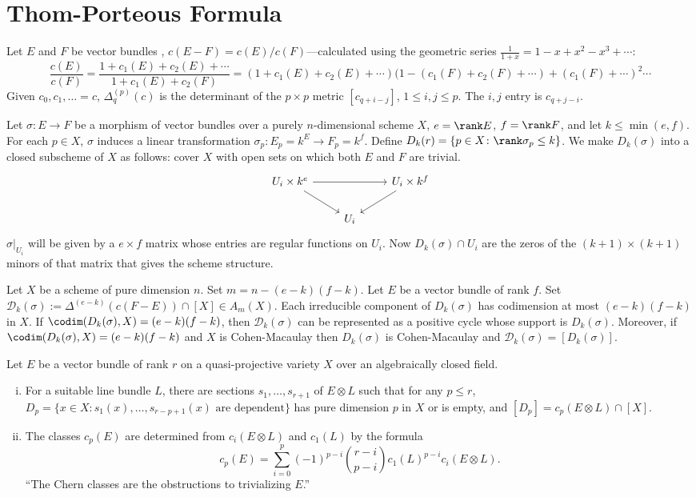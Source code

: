 \section{Thom-Porteous Formula}


Let $E$ and $F$ be vector bundles , $c(E-F)=c(E)/c(F)$---calculated using the geometric series $\frac{1}{1+x}=1-x+x^2-x^3+\cdots$:
	\[
	\dfrac{c(E)}{c(F)}= \dfrac{1+c_1(E)+c_2(E)+\cdots}{1+c_1(E)+c_2(F)} = (1+c_1(E)+c_2(E)+\cdots)(1- (c_1(F)+c_2(F)+\cdots) + (c_1(F)+\cdots)^2 \cdots
	\]
Given $c_0,c_1,\ldots=c$, $\Delta_q^{(p)}(c)$ is the determinant of the $p \times p$ metric $[c_{q+i-j}]$, $1 \leq i, j \leq p$. The $i,j$ entry is $c_{q+j-i}$.

Let $\sigma: E \to F$ be a morphism of vector bundles over a purely $n$-dimensional scheme $X$, $e=\rank E$, $f=\rank F$, and let $k \leq \min(e,f)$. For each $p \in X$, $\sigma$ induces a linear transformation $\sigma_p: E_p=k^E \to F_p=k^f$. Define $D_k(r)=\{p \in X \colon \rank \sigma_p \leq k \}$. We make $D_k(\sigma)$ into a closed subscheme of $X$ as follows: cover $X$ with open sets on which both $E$ and $F$ are trivial. 
	\[
	\begin{tikzcd}
	U_i \times k^e \arrow{rr} \arrow{dr} & & U_i \times k^f \arrow{dl} \\
	& U_i & 
	\end{tikzcd}
	\]
$\sigma\big|_{U_i}$ will be given by a $e \times f$ matrix whose entries are regular functions on $U_i$. Now $D_k(\sigma) \cap U_i$ are the zeros of the $(k+1) \times (k+1)$ minors of that matrix that gives the scheme structure. 

\begin{thmm}
Let $X$ be a scheme of pure dimension $n$. Set $m=n-(e-k)(f-k)$. Let $E$ be a vector bundle of rank $f$. Set $\mathcal{D}_k(\sigma):= \Delta^{(e-k)}(c(F-E)) \cap [X] \in A_m(X)$. Each irreducible component of $D_k(\sigma)$ has codimension at most $(e-k)(f-k)$ in $X$. If $\codim(D_k(\sigma),X)=(e-k)(f-k)$, then $\mathcal{D}_k(\sigma)$ can be represented as a positive cycle whose support is $D_k(\sigma)$. Moreover, if $\codim(D_k(\sigma),X)=(e-k)(f-k)$ and $X$ is Cohen-Macaulay then $D_k(\sigma)$ is Cohen-Macaulay and $\mathcal{D}_k(\sigma)=[D_k(\sigma)]$. 
\end{thmm}


\begin{ex}
Let $E$ be a vector bundle of rank $r$ on a quasi-projective variety $X$ over an algebraically closed field. 
\begin{enumerate}[(i)]
\item For a suitable line bundle $L$, there are sections $s_1,\ldots,s_{r+1}$ of $E \otimes L$ such that for any $p \leq r$, $D_p=\{x \in X \colon s_1(x), \ldots, s_{r-p+1}(x) \text{ are dependent}\}$ has pure dimension $p$ in $X$ or is empty, and $[D_p]=c_p(E \otimes L) \cap [X]$. 
\item The classes $c_p(E)$ are determined from $c_i(E \otimes L)$ and $c_1(L)$ by the formula 
	\[
	c_p(E)= \sum_{i=0}^p (-1)^{p-i} \binom{r-i}{p-i} c_1(L)^{p-i} c_i(E\otimes L).
	\]
``The Chern classes are the obstructions to trivializing $E$.'' 
\end{enumerate}
\end{ex}
